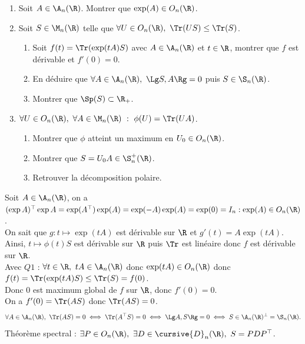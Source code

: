 \documentclass[11pt]{article}
\begin{document}
\begin{exercice}{}{}
    \begin{enumerate}
        \item Soit $A\in\A_n(\R)$. Montrer que $\exp(A)\in O_n(\R)$.
        \item Soit $S\in\M_n(\R)$ telle que $\forall U \in O_n(\R), ~ \Tr(US)\leq \Tr(S)$.
        \begin{enumerate}
            \item Soit $f(t)=\Tr(\exp(tA)S)$ avec $A\in \A_n(\R)$ et $t\in\R$, montrer que $f$ est dérivable et $f'(0)=0$.
            \item En déduire que $\forall A \in \A_n(\R), ~ \Lg S,A \Rg = 0$ puis $S\in\S_n(\R)$.
            \item Montrer que $\Sp(S)\subset\R_+$.
        \end{enumerate}
        \item $\forall U \in O_n(\R), ~ \forall A \in \M_n(\R) ~:~ \phi(U)=\Tr(UA)$.
        \begin{enumerate}
            \item Montrer que $\phi$ atteint un maximum en $U_0\in O_n(\R)$.
            \item Montrer que $S=U_0A\in\S_n^+(\R)$.
            \item Retrouver la décomposition polaire.
        \end{enumerate}
    \end{enumerate}
    \tcblower
     Soit $A\in \A_n(\R)$, on a $(\exp A)^\top \exp A = \exp( A^\top)\exp(A) = \exp(-A)\exp(A)=\exp(0)=I_n:\exp(A)\in O_n(\R)$.\\
     On sait que $g:t\mapsto \exp(tA)$ est dérivable sur $\R$ et $g'(t)=A\exp(tA)$.\\
    Ainsi, $t\mapsto \phi(t)S$ est dérivable sur $\R$ puis $\Tr$ est linéaire donc $f$ est dérivable sur $\R$. \\
    Avec $Q1$ : $\forall t \in \R, ~ tA \in \A_n(\R)$ donc $\exp(tA)\in O_n(\R)$ donc $f(t)=\Tr(\exp(t A) S) \leq \Tr(S) = f(0)$.\\
    Donc 0 est maximum global de $f$ sur $\R$, donc $f'(0)=0$.\\
     On a $f'(0)=\Tr(AS)$ donc $\Tr(AS)=0$.
    \begin{equation*}
        \forall A \in \A_n(\R), ~ \Tr(AS) = 0 \iff \Tr(A^\top S) = 0 \iff \Lg A,S \Rg = 0 \iff S \in \A_n(\R)^\bot = \S_n(\R).
    \end{equation*}
     Théorème spectral : $\exists P \in O_n(\R), ~ \exists D \in \cursive{D}_n(\R), ~ S=PDP^\top$.

\end{exercice}
\end{document}
